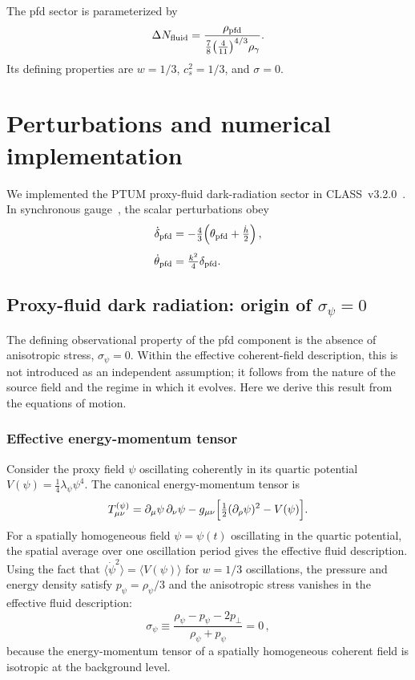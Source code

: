 \documentclass[epj]{svjour}
\begin{document}
The pfd sector is parameterized by
\begin{equation}
\Delta N_{\rm fluid}
=\frac{\rho_{\rm pfd}}
{\tfrac{7}{8}\!\left(\tfrac{4}{11}\right)^{4/3}\!\rho_\gamma}.
\end{equation}
Its defining properties are \(w=1/3\), \(c_s^2=1/3\),
and \(\sigma=0\).

\section{Perturbations and numerical implementation}
\label{sec:pert}

We implemented the PTUM proxy-fluid dark-radiation sector in
CLASS~v3.2.0~\cite{Blas2011,Lesgourgues2011}. In synchronous
gauge~\cite{MaBertschinger}, the scalar perturbations obey
\begin{align}
\dot\delta_{\rm pfd}
&=-\tfrac{4}{3}\!\left(\theta_{\rm pfd}+\tfrac{\dot h}{2}\right),
\\[4pt]
\dot\theta_{\rm pfd}
&=\tfrac{k^2}{4}\delta_{\rm pfd}.
\end{align}

\subsection{Proxy-fluid dark radiation: origin of $\sigma_\psi=0$}
\label{sec:pfd_derivation}

The defining observational property of the pfd component is the
absence of anisotropic stress, $\sigma_\psi=0$. Within the effective coherent-field description, this is not introduced
as an independent assumption; it follows from the nature of the source
field and the regime in which it evolves. Here we derive this result from the
equations of motion.

\subsubsection{Effective energy-momentum tensor}

Consider the proxy field $\psi$ oscillating coherently in its quartic
potential $V(\psi)=\frac{1}{4}\lambda_\psi\psi^4$. The canonical
energy-momentum tensor is
\begin{equation}
T_{\mu\nu}^{(\psi)}
=\partial_\mu\psi\,\partial_\nu\psi
-g_{\mu\nu}\Bigl[\tfrac12(\partial_\rho\psi)^{2}
-V(\psi)\Bigr].
\end{equation}
For a spatially homogeneous field $\psi=\psi(t)$ oscillating in the
quartic potential, the spatial average over one oscillation period
gives the effective fluid description. Using the fact that
$\langle\dot\psi^2\rangle=\langle V(\psi)\rangle$ for $w=1/3$
oscillations, the pressure and energy density satisfy
$p_\psi=\rho_\psi/3$ and the anisotropic stress vanishes in the
effective fluid description:
\begin{equation}
\sigma_\psi \equiv 
\frac{\rho_\psi-p_\psi-2p_\perp}{\rho_\psi+p_\psi}=0\,,
\end{equation}
because the energy-momentum tensor of a spatially homogeneous
coherent field is isotropic at the background level.
\end{document}
